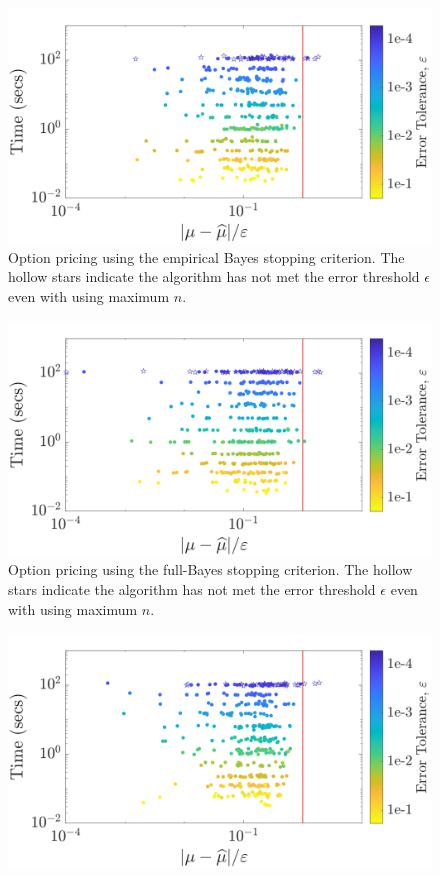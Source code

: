 \documentclass{svjour3}                     %
\begin{document}
{{{{{{\begin{figure}
\centering
\includegraphics[width=0.95\linewidth]{"figures/Sobol/Sobol_optPrice_guaranteed_time_MLE__d12_r1_2019-Sep-1"}
\caption[Sobol: Option pricing guaranteed: MLE]{Option pricing using the empirical Bayes stopping criterion. The hollow stars indicate the algorithm has not met the error threshold $\epsilon$ even with using maximum $n$.}
\label{fig:Sobol-optprice-guaranteed-MLE}
\end{figure}
\begin{figure}
\centering
\includegraphics[width=0.95\linewidth]{"figures/Sobol/Sobol_optPrice_guaranteed_time_full__d12_r1_2019-Sep-1"}
\caption[Sobol: Option pricing guaranteed: Full Bayes]{Option pricing using the full-Bayes stopping criterion. The hollow stars indicate the algorithm has not met the error threshold $\epsilon$ even with using maximum $n$.}
\label{fig:Sobol-optprice-guaranteed-FB}
\end{figure}
\begin{figure}
\centering
\includegraphics[width=0.95\linewidth]{"figures/Sobol/Sobol_optPrice_guaranteed_time_GCV__d12_r1_2019-Sep-1"}

\end{figure}}}}}}}
\end{document}
